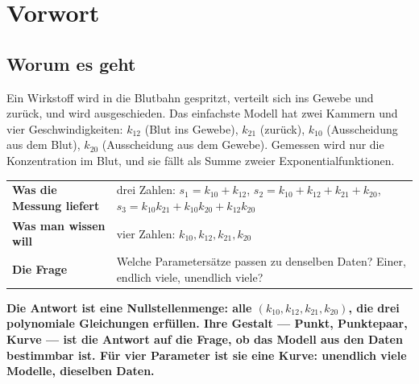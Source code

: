\chapter*{Vorwort}

\section*{Worum es geht}

\begin{merksatz}
Ein Wirkstoff wird in die Blutbahn gespritzt, verteilt sich ins Gewebe und zurück, und wird ausgeschieden. Das einfachste Modell hat zwei Kammern und vier Geschwindigkeiten: $k_{12}$ (Blut ins Gewebe), $k_{21}$ (zurück), $k_{10}$ (Ausscheidung aus dem Blut), $k_{20}$ (Ausscheidung aus dem Gewebe). Gemessen wird nur die Konzentration im Blut, und sie fällt als Summe zweier Exponentialfunktionen.

\begin{center}
{\small
\renewcommand{\arraystretch}{1.5}
\begin{tabular}{@{}P{3.6cm}P{5.0cm}@{}}
\toprule
\textbf{Was die Messung liefert} & drei Zahlen: $s_1 = k_{10} + k_{12}$, $s_2 = k_{10} + k_{12} + k_{21} + k_{20}$, $s_3 = k_{10}k_{21} + k_{10}k_{20} + k_{12}k_{20}$\\
\textbf{Was man wissen will} & vier Zahlen: $k_{10}, k_{12}, k_{21}, k_{20}$\\
\textbf{Die Frage} & Welche Parametersätze passen zu denselben Daten? Einer, endlich viele, unendlich viele?\\
\bottomrule
\end{tabular}}
\end{center}

\begin{center}
\begin{minipage}{0.9\textwidth}
\textbf{Die Antwort ist eine Nullstellenmenge: alle $(k_{10}, k_{12}, k_{21}, k_{20})$, die drei polynomiale Gleichungen erfüllen. Ihre Gestalt --- Punkt, Punktepaar, Kurve --- ist die Antwort auf die Frage, ob das Modell aus den Daten bestimmbar ist. Für vier Parameter ist sie eine Kurve: unendlich viele Modelle, dieselben Daten.}
\end{minipage}
\end{center}


\end{merksatz}
